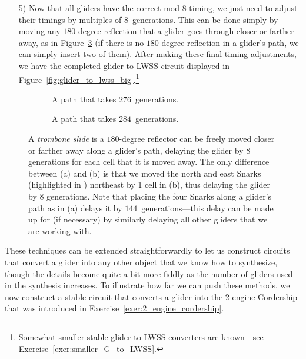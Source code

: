 \begin{itemize}
	\item[5)] Now that all gliders have the correct mod-$8$ timing, we just need to adjust their timings by multiples of $8$~generations. This can be done simply by moving any $180$-degree reflection that a glider goes through closer or farther away, as in Figure~\ref{fig:trombone_slide} (if there is no $180$-degree reflection in a glider's path, we can simply insert two of them). After making these final timing adjustments, we have the completed glider-to-LWSS circuit displayed in Figure~\ref{fig:glider_to_lwss_big}.\footnote{Somewhat smaller stable glider-to-LWSS converters are known---see Exercise~\ref{exer:smaller_G_to_LWSS}.}\medskip
\end{itemize}

\begin{figure}[!htb]
	\centering
	\begin{subfigure}{.485\textwidth}
		\centering
		\caption{A path that takes $276$~generations.}\label{fig:trombone_slide_276}
	\end{subfigure} \hfill %
	\begin{subfigure}{.485\textwidth}
		\centering
		\caption{A path that takes $284$~generations.}
		\label{fig:trombone_slide_284}
	\end{subfigure}
	\caption{A \emph{trombone slide} is a $180$-degree reflector can be freely moved closer or farther away along a glider's path, delaying the glider by $8$ generations for each cell that it is moved away. The only difference between (a) and (b) is that we moved the north and east Snarks (highlighted in ) northeast by 1 cell in (b), thus delaying the glider by $8$ generations. Note that placing the four Snarks along a glider's path as in (a) delays it by $144$~generations---this delay can be made up for (if necessary) by similarly delaying all other gliders that we are working with.}\label{fig:trombone_slide}
\end{figure}

These techniques can be extended straightforwardly to let us construct circuits that convert a glider into any other object that we know how to synthesize, though the details become quite a bit more fiddly as the number of gliders used in the synthesis increases. To illustrate how far we can push these methods, we now construct a stable circuit that converts a glider into the 2-engine Cordership that was introduced in Exercise~\ref{exer:2_engine_cordership}.


